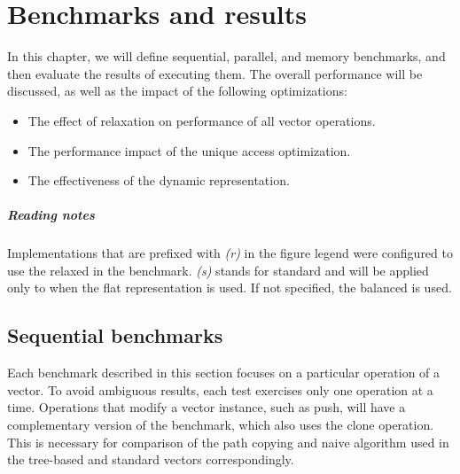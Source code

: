 \newcommand{\balanced}{}
\newcommand{\standard}{\emph{(s)}}
\newcommand{\relaxed}{\emph{(r)}}

\chapter{Benchmarks and results}
\label{chapter:benchmarks-and-results}

In this chapter, we will define sequential, parallel, and memory benchmarks, and then evaluate the results of executing them. The overall performance will be discussed, as well as the impact of the following optimizations:

\begin{itemize}
    \item The effect of \rrbtree{} relaxation on performance of all vector operations.
    \item The performance impact of the unique access optimization.
    \item The effectiveness of the dynamic representation.
\end{itemize}

\paragraph{Reading notes}
Implementations that are prefixed with \relaxed{} in the figure legend were configured to use the relaxed \treerrb{} in the benchmark. \standard{} stands for standard and will be applied only to \pvec{} when the flat representation is used. If not specified, the balanced \treerb{} is used.

\section{Sequential benchmarks}
Each benchmark described in this section focuses on a particular operation of a vector. To avoid ambiguous results, each test exercises only one operation at a time. Operations that modify a vector instance, such as push, will have a complementary version of the benchmark, which also uses the clone operation. This is necessary for comparison of the path copying and naive algorithm used in the tree-based and standard vectors correspondingly.

